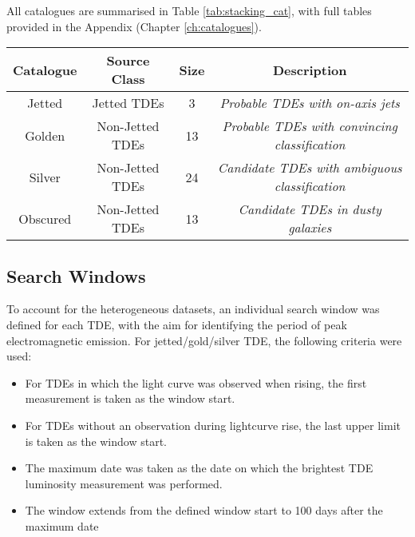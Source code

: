 All catalogues are summarised in Table \ref{tab:stacking_cat}, with full tables provided in the Appendix (Chapter \ref{ch:catalogues}).

\begin{table*}[]
	\centering
	\begin{tabular}{||c c c c |} 
		\hline
		Catalogue & Source Class & Size & Description \\ [0.5ex] 
		\hline\hline
		Jetted & Jetted TDEs &  3 & \textit{Probable TDEs with on-axis jets}\\ 
		\hline
		Golden & Non-Jetted TDEs & 13 & \textit{Probable TDEs with convincing classification}\\
		\hline
		Silver & Non-Jetted TDEs & 24 & \textit{Candidate TDEs with ambiguous classification}\\
		\hline
		Obscured & Non-Jetted TDEs & 13 & \textit{Candidate TDEs in dusty galaxies}\\[1ex] 
		\hline
	\end{tabular}
	\caption{Summary of the four TDE catalogues..}
	\label{tab:stacking_cat}
\end{table*}{}

\subsection{Search Windows}

To account for the heterogeneous datasets, an individual search window was defined for each TDE, with the aim for identifying the period of peak electromagnetic emission. For jetted/gold/silver TDE, the following criteria were used:

\begin{itemize}
	\item For TDEs in which the light curve was observed when rising, the first measurement is taken as the window start.
	
	\item For TDEs without an observation during lightcurve rise, the last upper limit is taken as the window start.
	
	\item The maximum date was taken as the date on which the brightest TDE luminosity measurement was performed.
	
	\item The window extends from the defined window start to 100 days after the maximum date
	
\end{itemize}

